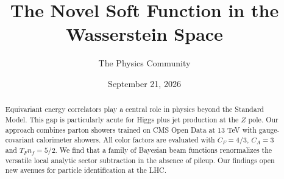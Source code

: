 \documentclass[11pt]{article}
\title{The Novel Soft Function in the Wasserstein Space}
\author{The Physics Community}
\date{September 21, 2026}
\numberwithin{equation}{section}
\theoremstyle{definition}
\theoremstyle{remark}
\begin{document}
\maketitle
\begin{abstract}
Equivariant energy correlators play a central role in physics beyond the
Standard Model. This gap is particularly acute for Higgs plus jet
production at the $Z$ pole. Our approach combines parton showers trained
on CMS Open Data at 13 TeV with gauge-covariant calorimeter showers. All
color factors are evaluated with $C_F = 4/3$, $C_A = 3$ and $T_F n_f =
5/2$. We find that a family of Bayesian beam functions renormalizes the
versatile local analytic sector subtraction in the absence of pileup.
Our findings open new avenues for particle identification at the LHC.
\end{abstract}
\tableofcontents






\nocite{*}


\end{document}
